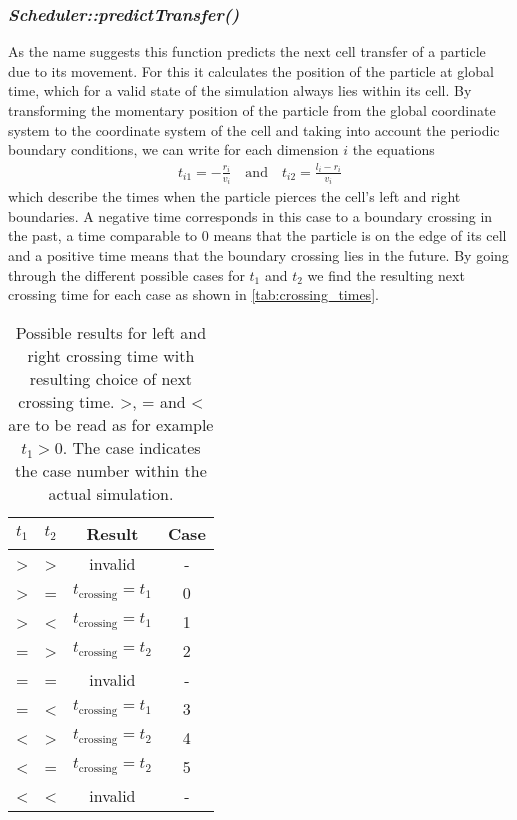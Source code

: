 \subsubsection{\quad \textit{Scheduler::predictTransfer()}}
As the name suggests this function predicts the next cell transfer of a particle due to its movement. For this it calculates the position of the particle at global time, which for a valid state of the simulation always lies within its cell. By transforming the momentary position of the particle from the global coordinate system to the coordinate system of the cell and taking into account the periodic boundary conditions, we can write for each dimension $i$ the equations
\begin{align}
t_{i1}=-\frac{r_i}{v_i} \quad \text{and} \quad t_{i2}=\frac{l_i-r_i}{v_i}
\end{align}
which describe the times when the particle pierces the cell's left and right boundaries. A negative time corresponds in this case to a boundary crossing in the past, a time comparable to 0 means that the particle is on the edge of its cell and a positive time means that the boundary crossing lies in the future. By going through the different possible cases for $t_1$ and $t_2$ we find the resulting next crossing time for each case as shown in \autoref{tab:crossing_times}.
\begin{table}[h]
\centering
\begin{tabular}{c|c||c|c}
$t_1$ & $t_2$ & Result & Case \\ \hline
> & > & invalid & - \\ \hline
> & = & $t_{\text{crossing}} = t_1$ & 0 \\ \hline
> & < & $t_{\text{crossing}} = t_1$ & 1 \\ \hline
= & > & $t_{\text{crossing}} = t_2$ & 2\\ \hline
= & = & invalid & - \\ \hline
= & < & $t_{\text{crossing}} = t_1$ & 3 \\ \hline
< & > & $t_{\text{crossing}} = t_2$ & 4 \\ \hline
< & = & $t_{\text{crossing}} = t_2$ & 5\\ \hline
< & < & invalid & - \\ \hline
\end{tabular}
\caption{Possible results for left and right crossing time with resulting choice of next crossing time. >, = and < are to be read as for example $t_1 > 0$. The case indicates the case number within the actual simulation.}
\label{tab:crossing_times}
\end{table}

